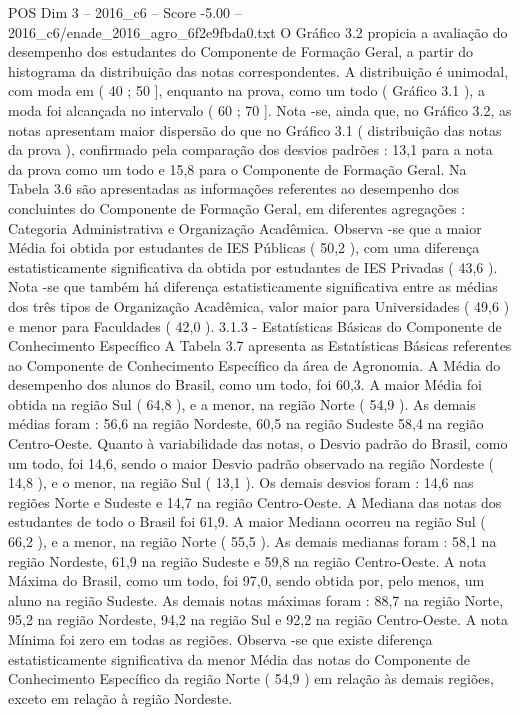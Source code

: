 \begin{textsample}{POS Dim 3 – 2016\_c6 – Score -5.00 – 2016\_c6/enade\_2016\_agro\_6f2e9fbda0.txt}
O Gráfico 3.2 propicia a avaliação do desempenho dos estudantes do Componente de Formação Geral, a partir do histograma da distribuição das notas correspondentes.
A distribuição é unimodal, com moda em ( 40 ; 50 ], enquanto na prova, como um todo ( Gráfico 3.1 ), a moda foi alcançada no intervalo ( 60 ; 70 ].
Nota -se, ainda que, no Gráfico 3.2, as notas apresentam maior dispersão do que no Gráfico 3.1 ( distribuição das notas da prova ), confirmado pela comparação dos desvios padrões : 13,1 para a nota da prova como um todo e 15,8 para o Componente de Formação Geral.
Na Tabela 3.6 são apresentadas as informações referentes ao desempenho dos concluintes do Componente de Formação Geral, em diferentes agregações : Categoria Administrativa e Organização Acadêmica.
Observa -se que a maior Média foi obtida por estudantes de IES Públicas ( 50,2 ), com uma diferença estatisticamente significativa da obtida por estudantes de IES Privadas ( 43,6 ).
Nota -se que também há diferença estatisticamente significativa entre as médias dos três tipos de Organização Acadêmica, valor maior para Universidades ( 49,6 ) e menor para Faculdades ( 42,0 ). 3.1.3 - Estatísticas Básicas do Componente de Conhecimento Específico A Tabela 3.7 apresenta as Estatísticas Básicas referentes ao Componente de Conhecimento Específico da área de Agronomia.
A Média do desempenho dos alunos do Brasil, como um todo, foi 60,3.
A maior Média foi obtida na região Sul ( 64,8 ), e a menor, na região Norte ( 54,9 ).
As demais médias foram : 56,6 na região Nordeste, 60,5 na região Sudeste 58,4 na região Centro-Oeste.
Quanto à variabilidade das notas, o Desvio padrão do Brasil, como um todo, foi 14,6, sendo o maior Desvio padrão observado na região Nordeste ( 14,8 ), e o menor, na região Sul ( 13,1 ).
Os demais desvios foram : 14,6 nas regiões Norte e Sudeste e 14,7 na região Centro-Oeste.
A Mediana das notas dos estudantes de todo o Brasil foi 61,9.
A maior Mediana ocorreu na região Sul ( 66,2 ), e a menor, na região Norte ( 55,5 ).
As demais medianas foram : 58,1 na região Nordeste, 61,9 na região Sudeste e 59,8 na região Centro-Oeste.
A nota Máxima do Brasil, como um todo, foi 97,0, sendo obtida por, pelo menos, um aluno na região Sudeste.
As demais notas máximas foram : 88,7 na região Norte, 95,2 na região Nordeste, 94,2 na região Sul e 92,2 na região Centro-Oeste.
A nota Mínima foi zero em todas as regiões.
Observa -se que existe diferença estatisticamente significativa da menor Média das notas do Componente de Conhecimento Específico da região Norte ( 54,9 ) em relação às demais regiões, exceto em relação à região Nordeste.

\end{textsample}
